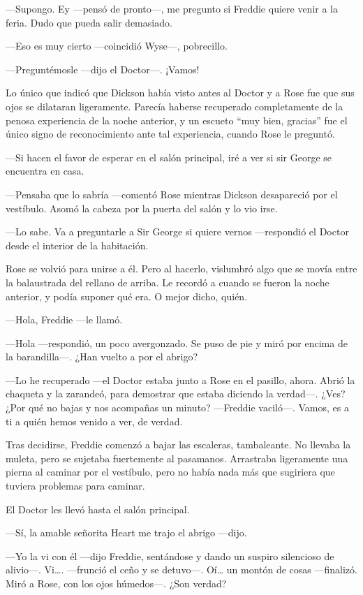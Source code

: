 {---Supongo. Ey ---pensó de pronto---, me pregunto si Freddie quiere
venir a la feria. Dudo que pueda salir demasiado.}

{---Eso es muy cierto ---coincidió Wyse---, pobrecillo.}

{---Preguntémosle ---dijo el Doctor---. ¡Vamos!}

{Lo único que indicó que Dickson había visto antes al Doctor y a Rose
	fue que sus ojos se dilataran ligeramente. Parecía haberse recuperado
	completamente de la penosa experiencia de la noche anterior, y un
	escueto ``muy bien, gracias'' fue el único signo de reconocimiento ante
tal experiencia, cuando Rose le preguntó.}

{---Si hacen el favor de esperar en el salón principal, iré a ver si sir
George se encuentra en casa.}

{---Pensaba que lo sabría ---comentó Rose mientras Dickson desapareció
	por el vestíbulo. Asomó la cabeza por la puerta del salón y lo vio
irse.}

{---Lo sabe. Va a preguntarle a Sir George si quiere vernos ---respondió
el Doctor desde el interior de la habitación.}

{Rose se volvió para unirse a él. Pero al hacerlo, vislumbró algo que se
	movía entre la balaustrada del rellano de arriba. Le recordó a cuando se
	fueron la noche anterior, y podía suponer qué era. O mejor dicho,
quién.}

{---Hola, Freddie ---le llamó.}

{---Hola ---respondió, un poco avergonzado. Se puso de pie y miró por
encima de la barandilla---. ¿Han vuelto a por el abrigo?}

{---Lo he recuperado ---el Doctor estaba junto a Rose en el pasillo,
	ahora. Abrió la chaqueta y la zarandeó, para demostrar que estaba
	diciendo la verdad---. ¿Ves? ¿Por qué no bajas y nos acompañas un
	minuto? ---Freddie vaciló---. Vamos, es a ti a quién hemos venido a ver,
de verdad.}

{Tras decidirse, Freddie comenzó a bajar las escaleras, tambaleante. No
	llevaba la muleta, pero se sujetaba fuertemente al pasamanos. Arrastraba
	ligeramente una pierna al caminar por el vestíbulo, pero no había nada
más que sugiriera que tuviera problemas para caminar.}

{El Doctor les llevó hasta el salón principal.}

{---Sí, la amable señorita Heart me trajo el abrigo ---dijo.}

{---Yo la vi con él ---dijo Freddie, sentándose y dando un suspiro
	silencioso de alivio---. Vi\ldots{}. ---frunció el ceño y se detuvo---.
	Oí\ldots{} un montón de cosas ---finalizó. Miró a Rose, con los ojos
húmedos---. ¿Son verdad?}

